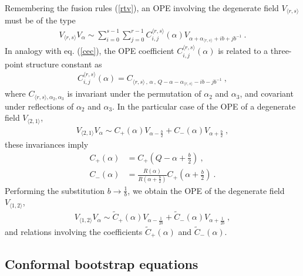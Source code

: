\documentclass[12pt,a4paper,notitlepage]{report}
\numberwithin{equation}{section}
\theoremstyle{break}
\begin{document}
Remembering the fusion rules (\ref{rtv}), an OPE involving the degenerate field $V_{\langle r,s \rangle}$ must be of the type
\begin{align}
 \boxed{V_{\langle r,s \rangle} V_\alpha \sim \sum_{i=0}^{s-1}\sum_{j=0}^{r-1} C_{i,j}^{\langle r,s \rangle}(\alpha) V_{\alpha+\alpha_{\langle r,s \rangle}+ib+jb^{-1}}}\ .
\label{vrsv}
\end{align}
In analogy with eq. (\ref{cec}), the OPE coefficient $C_{i,j}^{\langle r,s \rangle}(\alpha)$ is related to a three-point structure constant  as 
\begin{align}
 C_{i,j}^{\langle r,s \rangle}(\alpha) = C_{\langle r,s \rangle\, ,\, \alpha\, ,\, Q-\alpha-\alpha_{\langle r,s \rangle}-ib-jb^{-1}}\ , 
\end{align}
where $C_{\langle r,s \rangle, \alpha_2,\alpha_3}$ is invariant under the permutation of $\alpha_2$ and $\alpha_3$, and covariant under reflections of $\alpha_2$ and $\alpha_3$.
In the particular case of the OPE of a degenerate field $V_{\langle 2,1 \rangle}$,
\begin{align}
 \boxed{V_{\langle 2,1 \rangle} V_\alpha \sim C_+(\alpha) V_{\alpha-\frac{b}{2}} + C_-(\alpha) V_{\alpha+\frac{b}{2}}}\ ,
\label{vot}
\end{align}
 these invariances imply 
\begin{align}
 C_+(\alpha) &= C_+(Q-\alpha+\tfrac{b}{2})\ ,
\label{cpcp}
\\
C_-(\alpha) & = \frac{R(\alpha)}{R(\alpha+\tfrac{b}{2})} C_+(\alpha+\tfrac{b}{2})\ . 
\label{cmcp}
\end{align}
Performing the substitution $b\rightarrow \frac{1}{b}$, we obtain
the OPE of the degenerate field $V_{\langle 1,2 \rangle}$,
\begin{align}
\boxed{V_{\langle 1,2 \rangle} V_\alpha \sim \tilde{C}_+(\alpha) V_{\alpha-\frac{1}{2b}} + \tilde{C}_-(\alpha) V_{\alpha+\frac{1}{2b}}}\ ,
 \label{vto}
\end{align}
and relations involving the coefficients $\tilde{C}_+(\alpha)$ and $\tilde{C}_-(\alpha)$.

\subsection{Conformal bootstrap equations \label{seccbe}}
\end{document}
